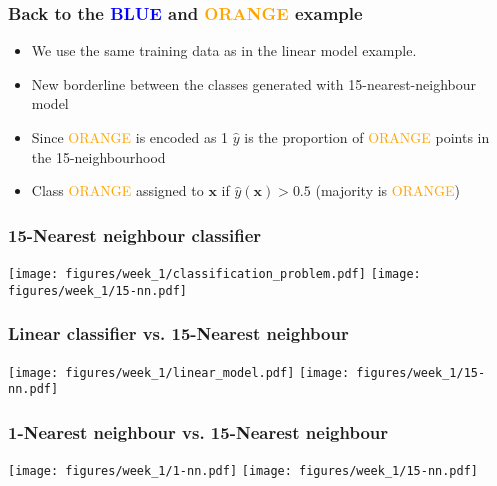 \documentclass[notes]{beamer}          %
\newcommand{\vect}[1]{\bm{#1}}
\newif\iffull
\begin{document}
\begin{frame}
\frametitle{Back to the \textcolor{blue}{BLUE} and \textcolor{orange}{ORANGE} example}
    \begin{itemize}
        \item We use the same training data as in the linear model example.
        \item New borderline between the classes generated with 15-nearest-neighbour model
        \item Since \textcolor{orange}{ORANGE} is encoded as 1 $\hat{y}$ is the proportion of \textcolor{orange}{ORANGE} points in the 15-neighbourhood
        \item Class \textcolor{orange}{ORANGE} assigned to $\vect{x}$ if $\hat{y}(\vect{x}) > 0.5$ (majority is \textcolor{orange}{ORANGE})
    \end{itemize}
\end{frame}

\begin{frame}
\frametitle{15-Nearest neighbour classifier}
    \begin{center}
        \texttt{[image: figures/week\_1/classification\_problem.pdf]}
        \hfill
        \texttt{[image: figures/week\_1/15-nn.pdf]}
    \end{center}
\end{frame}

\begin{frame}
\frametitle{Linear classifier vs. 15-Nearest neighbour}
    \begin{center}
        \texttt{[image: figures/week\_1/linear\_model.pdf]}
        \hfill
        \texttt{[image: figures/week\_1/15-nn.pdf]}
    \end{center}
\end{frame}


\begin{frame}
\frametitle{1-Nearest neighbour vs. 15-Nearest neighbour}
    \begin{center}
        \texttt{[image: figures/week\_1/1-nn.pdf]}
        \hfill
        \texttt{[image: figures/week\_1/15-nn.pdf]}
    \end{center}
\end{frame}

\iffull
\begin{frame}
\frametitle{Comparison of the techniques}
    \begin{itemize}
        \item 15-NN seems to work better than the linear classifier since fewer points are missclassified.
        \item On the other hand, {\bf none} of the points in the 1-NN case was misclassified!?
        \item Actually with the 1-NN method the error on {\bf training data} is always 0.
        \item An independent test set needed to obtain a better comparison of the methods.
    \end{itemize}
\end{frame}
\fi
\end{document}
